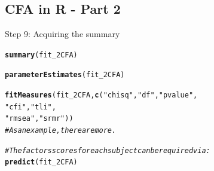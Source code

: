 \documentclass[10pt]{beamer}\usepackage[]{graphicx}\usepackage[]{xcolor}
\makeatletter
\newcommand{\hlstr}[1]{\textcolor[rgb]{0.192,0.494,0.8}{#1}}%
\newcommand{\hlcom}[1]{\textcolor[rgb]{0.678,0.584,0.686}{\textit{#1}}}%
\newcommand{\hlstd}[1]{\textcolor[rgb]{0.345,0.345,0.345}{#1}}%
\newcommand{\hlkwd}[1]{\textcolor[rgb]{0.737,0.353,0.396}{\textbf{#1}}}%
\newenvironment{kframe}{%
 \def\at@end@of@kframe{}%
 \ifinner\ifhmode%
  \def\at@end@of@kframe{\end{minipage}}%
  \begin{minipage}{\columnwidth}%
 \fi\fi%
 \def\FrameCommand##1{\hskip\@totalleftmargin \hskip-\fboxsep
 \colorbox{shadecolor}{##1}\hskip-\fboxsep
     \hskip-\linewidth \hskip-\@totalleftmargin \hskip\columnwidth}%
 \MakeFramed {\advance\hsize-\width
   \@totalleftmargin\z@ \linewidth\hsize
   \@setminipage}}%
 {\par\unskip\endMakeFramed%
 \at@end@of@kframe}
\newenvironment{knitrout}{}{} %
\makeatother
\begin{document}
\subsection*{CFA in R - Part 2}
%
\begin{frame}[fragile]{Step 9: Acquiring the summary}

\begin{knitrout}
\color{fgcolor}\begin{kframe}
\begin{alltt}
\hlkwd{summary}\hlstd{(fit_2CFA)}

\hlkwd{parameterEstimates}\hlstd{(fit_2CFA)}

\hlkwd{fitMeasures}\hlstd{(fit_2CFA,} \hlkwd{c}\hlstd{(}\hlstr{"chisq"}\hlstd{,} \hlstr{"df"}\hlstd{,} \hlstr{"pvalue"}\hlstd{,}
                        \hlstr{"cfi"}\hlstd{,} \hlstr{"tli"}\hlstd{,}
                        \hlstr{"rmsea"}\hlstd{,}\hlstr{"srmr"}\hlstd{))}
\hlcom{# As an example, there are more.}
\end{alltt}
\end{kframe}
\end{knitrout}

\begin{knitrout}
\color{fgcolor}\begin{kframe}
\begin{alltt}
\hlcom{#The factors scores for each subject can be required via:}
\hlkwd{predict}\hlstd{(fit_2CFA)}
\end{alltt}
\end{kframe}
\end{knitrout}

\end{frame}
%
\end{document}

